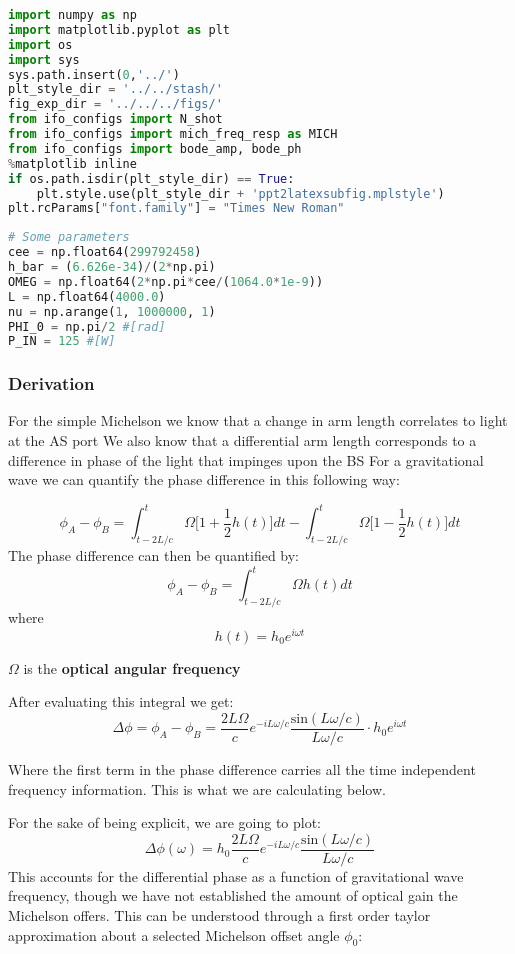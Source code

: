 \begin{lstlisting}[frame=single, language=Python]
import numpy as np
import matplotlib.pyplot as plt
import os
import sys
sys.path.insert(0,'../')
plt_style_dir = '../../stash/'
fig_exp_dir = '../../../figs/'
from ifo_configs import N_shot
from ifo_configs import mich_freq_resp as MICH
from ifo_configs import bode_amp, bode_ph
%matplotlib inline
if os.path.isdir(plt_style_dir) == True:
    plt.style.use(plt_style_dir + 'ppt2latexsubfig.mplstyle')
plt.rcParams["font.family"] = "Times New Roman"
\end{lstlisting}

\begin{lstlisting}[frame=single, language=Python]
# Some parameters
cee = np.float64(299792458)
h_bar = (6.626e-34)/(2*np.pi)
OMEG = np.float64(2*np.pi*cee/(1064.0*1e-9))
L = np.float64(4000.0)
nu = np.arange(1, 1000000, 1)
PHI_0 = np.pi/2 #[rad]
P_IN = 125 #[W]
\end{lstlisting}

\hypertarget{derivation}{%
\subsubsection{Derivation}\label{derivation}}

For the simple Michelson we know that a change in arm length correlates
to light at the AS port We also know that a differential arm length
corresponds to a difference in phase of the light that impinges upon the
BS For a gravitational wave we can quantify the phase difference in this
following way:

\[
\phi_A - \phi_B = \int_{t-2L/c}^{t} \Omega \bigg[1 + \frac{1}{2}h(t)\bigg]dt - \int_{t-2L/c}^{t} \Omega \bigg[1 - \frac{1}{2}h(t)\bigg]dt \label{eq1}\tag{1}
\] The phase difference can then be quantified by: \[
\phi_A - \phi_B = \int_{t-2L/c}^{t} \Omega h(t)dt \label{eq2}\tag{2}
\] where \[ 
h(t) = h_0 e^{i \omega t} \label{eq3}\tag{3}
\]

\emph{\(\Omega\)} is the \textbf{optical angular frequency}

After evaluating this integral we get: \[
\Delta \phi=\phi_A - \phi_B = \frac{2 L \Omega}{c}e^{-i L \omega / c} \frac{\mathrm{sin}(L \omega /c)}{L \omega /c} \cdot h_0 e^{i \omega t}
\]

Where the first term in the phase difference carries all the time
independent frequency information. This is what we are calculating
below.

For the sake of being explicit, we are going to plot: \[
\Delta \phi (\omega) = h_0\frac{2 L \Omega}{c}e^{-i L \omega / c} \frac{\mathrm{sin}(L \omega /c)}{L \omega /c}
\]This accounts for the differential phase as a function of
gravitational wave frequency, though we have not established the amount
of optical gain the Michelson offers. This can be understood through a
first order taylor approximation about a selected Michelson offset angle
\(\phi_0\):

